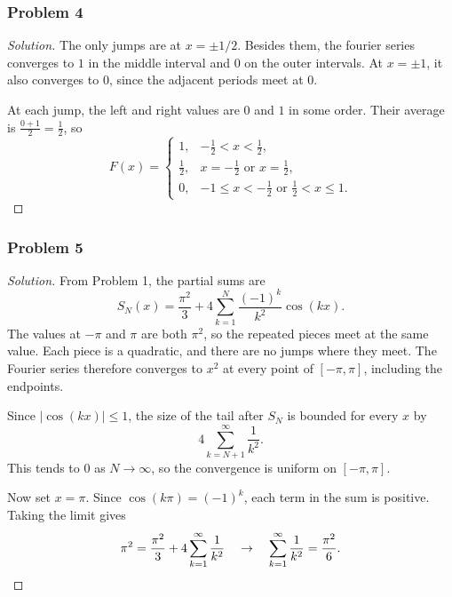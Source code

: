 \documentclass[11pt]{article}
\newcommand{\1}{\mathbf{1}}
\theoremstyle{definition}
\newenvironment{solution}{\begin{proof}[Solution]}{\end{proof}}
\begin{document}
\subsubsection*{Problem 4}
\begin{solution}
The only jumps are at $x=\pm1/2$. Besides them, 
the fourier series converges to $1$ in the middle interval and $0$ on
the outer intervals. At $x=\pm1$, it also converges to $0$, since the
adjacent periods meet at $0$.
\par At each jump, the left and right values are $0$ and $1$ in some
order. Their average is $\frac{0+1}{2} =\frac{1}{2}$, so
\[
F(x)=
\begin{cases}
1, & -\frac12<x<\frac12,\\[3pt]
\frac12, & x=-\frac12\text{ or }x=\frac12,\\[3pt]
0, & -1\leq x<-\frac12\text{ or }\frac12<x\leq1.
\end{cases}
\]
\end{solution}
\subsubsection*{Problem 5}
\begin{solution}
From Problem 1, the partial sums are
\[
S_N(x)=\frac{\pi^2}{3}
+4\sum_{k=1}^{N}\frac{(-1)^k}{k^2}\cos(kx).
\]
The values at $-\pi$ and $\pi$ are both $\pi^2$, so the repeated pieces
meet at the same value. Each piece is a quadratic, and there are no
jumps where they meet. The Fourier series therefore converges to $x^2$
at every point of $[-\pi,\pi]$, including the endpoints.
\par Since $|\cos(kx)|\leq1$, the size of the tail after $S_N$ is bounded for every
$x$ by
\[
4\sum_{k=N+1}^{\infty}\frac{1}{k^2}.
\]
This tends to $0$ as $N\rightarrow\infty$, so the convergence is
uniform on $[-\pi,\pi]$.
\par Now set $x=\pi$. Since $\cos(k\pi)=(-1)^k$, each term in the
sum is positive. Taking the limit gives
\[
\pi^2=\frac{\pi^2}{3}+4\sum_{k=1}^{\infty}\frac1{k^2}
\quad\rightarrow\quad
\sum_{k=1}^{\infty}\frac1{k^2}=\frac{\pi^2}{6}.\qedhere
\]
\end{solution}
\end{document}
